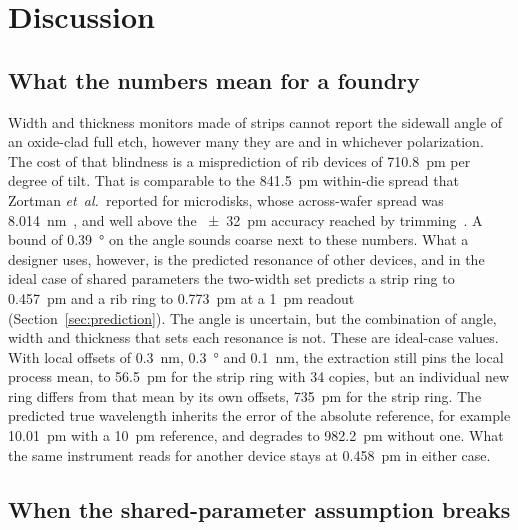 \section{Discussion}
\label{sec:discussion}

\subsection{What the numbers mean for a foundry}

Width and thickness monitors made of strips cannot report the sidewall angle of an oxide-clad full etch, however
many they are and in whichever polarization. The cost of that blindness is a misprediction of rib devices of
\qty{710.8}{pm} per degree of tilt. That is comparable to the \qty{841.5}{pm} within-die spread that Zortman \textit{et~al.}\
reported for microdisks, whose across-wafer spread was \qty{8.014}{nm}~\cite{zortman2010}, and well above the
\qty{\pm 32}{pm} accuracy reached by trimming~\cite{jayatilleka2021}. A bound of
\qty{0.39}{\degree} on the angle sounds coarse next to these numbers. What a designer uses, however, is the predicted
resonance of other devices, and in the ideal case of shared parameters the two-width set predicts a strip ring to
\qty{0.457}{pm} and a rib ring to \qty{0.773}{pm} at a \qty{1}{pm} readout (Section~\ref{sec:prediction}). The angle
is uncertain, but the combination of angle, width and thickness that sets each resonance is not. These are ideal-case values. With local
offsets of \qty{0.3}{nm}, \qty{0.3}{\degree} and \qty{0.1}{nm}, the extraction still pins the local process mean, to \qty{56.5}{pm} for the
strip ring with 34 copies, but an individual new ring differs from that mean by its own offsets, \qty{735}{pm} for the strip ring. The predicted true wavelength
inherits the error of the absolute reference, for example \qty{10.01}{pm} with a \qty{10}{pm} reference, and degrades to \qty{982.2}{pm} without one. What the same
instrument reads for another device stays at \qty{0.458}{pm} in either case.

\subsection{When the shared-parameter assumption breaks}

